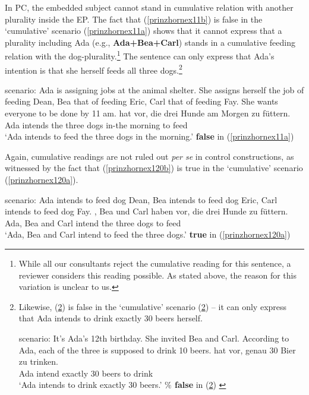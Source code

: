 \documentclass[output=paper,colorlinks,citecolor=brown,
]{langscibook}
\begin{document}
In PC, the embedded subject cannot stand in cumulative relation with another plurality inside the EP. The fact that (\ref{prinzhornex11b}) is false in the `cumulative' scenario (\ref{prinzhornex11a}) shows that it cannot express that a plurality including Ada (e.g., \textbf{Ada+Bea+Carl}) stands in a cumulative feeding relation with the dog-plurality.\footnote{While all our consultants reject the cumulative reading for this sentence, a reviewer considers this reading possible. As stated above, the reason for this variation is unclear to us.} The sentence can only express that Ada's intention is that she herself feeds all three dogs.\footnote{Likewise, (\ref{prinzhornex12b}) is false in the `cumulative' scenario (\ref{prinzhornex12a}) -- it can only express that Ada intends to drink exactly 30 beers herself. 

\ea 
\ea \label{prinzhornex12a} {\sc scenario: } It's Ada's 12th birthday. She invited Bea and Carl. According to Ada, each of the three is supposed to drink 10 beers.
\ex {} {hat} {vor}, {genau} {30} {Bier} {zu} {trinken}.\\
   Ada intend {} exactly 30 beers to drink \\
   \glt `Ada intends to drink exactly 30 beers.' \hfill \textbf{$\%$ false} in (\ref{prinzhornex12a})  \label{prinzhornex12b}
\z \z

}

\ea \label{prinzhornex11}
\ea \label{prinzhornex11a} {\sc scenario: } Ada is assigning jobs at the animal shelter. She assigns herself the job of feeding Dean,  Bea that of feeding  Eric,  Carl that of feeding  Fay. She wants everyone to be done by 11 am. 
\ex {} {hat} {vor}, {die} {drei} {Hunde} {am} {Morgen} {zu} {füttern}.\\
   Ada intends {} the three dogs in-the morning to feed \\
   \glt `Ada intends to feed the three dogs in the morning.' \hfill \textbf{false} in (\ref{prinzhornex11a}) \label{prinzhornex11b}
\z \z

Again, cumulative readings are not ruled out \textit{per se} in control constructions, as witnessed by the fact that (\ref{prinzhornex120b}) is true in the `cumulative' scenario (\ref{prinzhornex120a}).

\ea \label{prinzhornex120}
\ea \label{prinzhornex120a} {\sc scenario: }  Ada intends to feed dog Dean, Bea intends to feed dog Eric, Carl intends to feed dog Fay.
\ex {}, {Bea} {und} {Carl} {haben} {vor}, {die} {drei} {Hunde}  {zu} {füttern}.\\
   Ada, Bea and Carl intend {} the three dogs  to feed \\
   \glt `Ada, Bea and Carl intend to feed the three dogs.' \hfill \textbf{true} in (\ref{prinzhornex120a}) \label{prinzhornex120b}
\z \z
\end{document}
